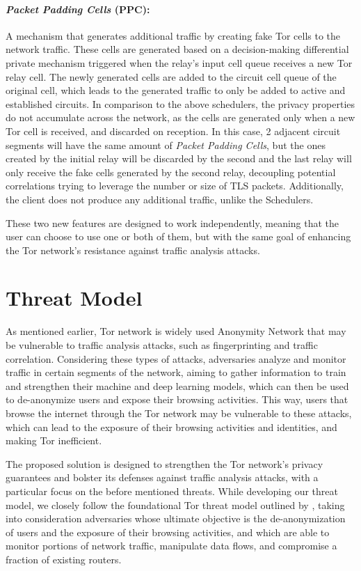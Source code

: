 \paragraph{\textit{Packet Padding Cells} (PPC):} A mechanism that generates additional traffic by creating fake Tor cells to the network traffic. These cells are generated based on a decision-making differential private mechanism triggered when the relay's input cell queue receives a new Tor relay cell. The newly generated cells are added to the circuit cell queue of the original cell, which leads to the generated traffic to only be added to active and established circuits.  In comparison to the above schedulers, the privacy properties do not accumulate across the network, as the cells are generated only when a new Tor cell is received, and discarded on reception. 
In this case, 2 adjacent circuit segments will have the same amount of \textit{Packet Padding Cells}, but the ones created by the initial relay will be discarded by the second and the last relay will only receive the fake cells generated by the second relay, decoupling potential correlations trying to leverage the number or size of TLS packets. Additionally, the client does not produce any additional traffic, unlike the Schedulers.

These two new features are designed to work independently, meaning that the user can choose to use one or both of them, but with the same goal of enhancing the Tor network's resistance against traffic analysis attacks.


\section{Threat Model}\label{sec:threat_model}

As mentioned earlier, Tor network is widely used Anonymity Network that may be vulnerable to traffic analysis attacks, such as fingerprinting and traffic correlation. Considering these types of attacks, adversaries analyze and monitor traffic in certain segments of the network, aiming to gather information to train and strengthen their machine and deep learning models, which can then be used to de-anonymize users and expose their browsing activities. This way, users that browse the internet through the Tor network may be vulnerable to these attacks, which can lead to the exposure of their browsing activities and identities, and making Tor inefficient. 

The proposed solution is designed to strengthen the Tor network's privacy guarantees and bolster its defenses against traffic analysis attacks, with a particular focus on the before mentioned threats. While developing our threat model, we closely follow the foundational Tor threat model outlined by \autocite{dingledine2004tor}, taking into consideration adversaries whose ultimate objective is the de-anonymization of users and the exposure of their browsing activities, and which are able to monitor portions of network traffic, manipulate data flows, and compromise a fraction of existing routers.


